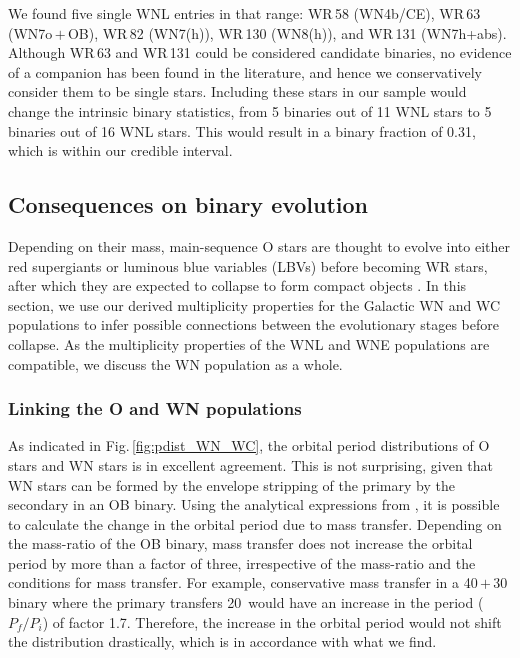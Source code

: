 We found five single WNL entries in that range: WR\,58 (WN4b/CE), WR\,63 (WN7o\,$+$\,OB), WR\,82 (WN7(h)), WR\,130 (WN8(h)), and WR\,131 (WN7h+abs). Although WR\,63 and WR\,131 could be considered candidate binaries, no evidence of a companion has been found in the literature, and hence we conservatively consider them to be single stars. Including these stars in our sample would change the intrinsic binary statistics, from 5 binaries out of 11 WNL stars to 5 binaries out of 16 WNL stars. This would result in a binary fraction of 0.31, which is within our credible interval.
\subsection{Consequences on binary evolution}  \label{sect:orbitalprop}
Depending on their mass, main-sequence O stars are thought to evolve into either red supergiants or luminous blue variables (LBVs) before becoming WR stars, after which they are expected to collapse to form compact objects \citep{1976Conti,meynet_stellar_2003,crowther_physical_2007,langer_presupernova_2012}. In this section, we use our derived multiplicity properties for the Galactic WN and WC populations to infer possible connections between the evolutionary stages before collapse. As the multiplicity properties of the WNL and WNE populations are compatible, we discuss the WN population as a whole.


\subsubsection{Linking the O and WN populations}\label{sect:OWN}

As indicated in Fig.\,\ref{fig:pdist_WN_WC}, the orbital period distributions of O stars and WN stars is in excellent agreement. This is not surprising, given that WN stars can be formed by the envelope stripping of the primary by the secondary in an OB binary. Using the analytical expressions from \citet{soberman_stability_1997}, it is possible to calculate the change in the orbital period due to mass transfer. Depending on the mass-ratio of the OB binary, mass transfer does not increase the orbital period by more than a factor of three, irrespective of the mass-ratio and the conditions for mass transfer. For example, conservative mass transfer in a 40\,$+$\,30\,\Msun{} binary where the primary transfers 20\,\Msun{} would have an increase in the period ($P_f/P_i$) of factor 1.7. Therefore, the increase in the orbital period would not shift the distribution drastically, which is in accordance with what we find.

